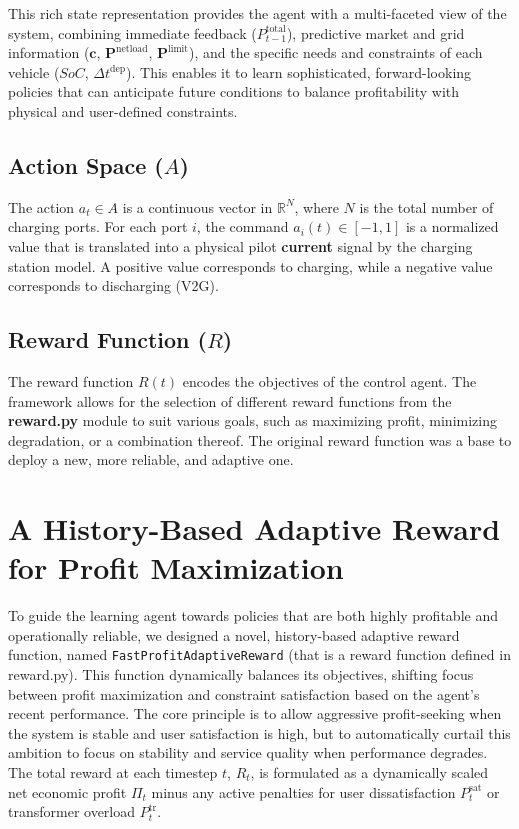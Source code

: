 This rich state representation provides the agent with a multi-faceted view of the system, combining immediate feedback ($P_{t-1}^{\text{total}}$), predictive market and grid information ($\mathbf{c}$, $\mathbf{P}^{\text{netload}}$, $\mathbf{P}^{\text{limit}}$), and the specific needs and constraints of each vehicle ($SoC$, $\Delta t^{\text{dep}}$). This enables it to learn sophisticated, forward-looking policies that can anticipate future conditions to balance profitability with physical and user-defined constraints.

\subsection{Action Space ($A$)}
The action $a_t \in A$ is a continuous vector in $\mathbb{R}^N$, where $N$ is the total number of charging ports. For each port $i$, the command $a_i(t) \in [-1, 1]$ is a normalized value that is translated into a physical pilot \textbf{current} signal by the charging station model. A positive value corresponds to charging, while a negative value corresponds to discharging (V2G).

\subsection{Reward Function ($R$)}
The reward function $R(t)$ encodes the objectives of the control agent. The framework allows for the selection of different reward functions from the \textbf{reward.py} module to suit various goals, such as maximizing profit, minimizing degradation, or a combination thereof.
The original \cite{orfanoudakis2024ev2gym} reward function was a base to deploy a new, more reliable, and adaptive one.
\section{A History-Based Adaptive Reward for Profit Maximization}
\label{sec:adaptive_reward}

To guide the learning agent towards policies that are both highly profitable and operationally reliable, we designed a novel, history-based adaptive reward function, named \texttt{FastProfitAdaptiveReward} (that is a reward function defined in reward.py). This function dynamically balances its objectives, shifting focus between profit maximization and constraint satisfaction based on the agent's recent performance. The core principle is to allow aggressive profit-seeking when the system is stable and user satisfaction is high, but to automatically curtail this ambition to focus on stability and service quality when performance degrades.
\\
\noindent
The total reward at each timestep $t$, $R_t$, is formulated as a dynamically scaled net economic profit $\Pi_t$ minus any active penalties for user dissatisfaction $P_t^{\text{sat}}$ or transformer overload $P_t^{\text{tr}}$.

